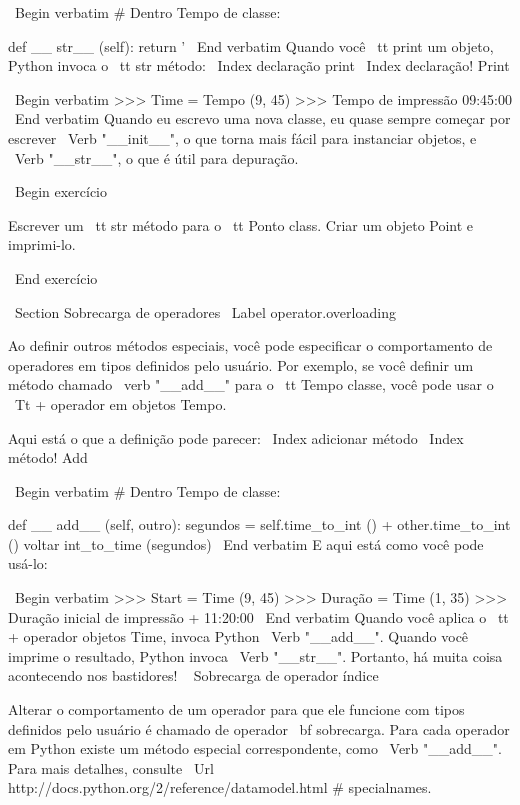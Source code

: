 \documentclass[10pt]{book}
\begin{document}
{{{{{{{{{{{{{{\ Begin {verbatim}
# Dentro Tempo de classe:

    def __ str__ (self):
        return '%
\ End {verbatim}
%
Quando você {\ tt print} um objeto, Python invoca o {\ tt str} método:
\ Index {declaração print}
\ Index {declaração! Print}

\ Begin {verbatim}
>>> Time = Tempo (9, 45)
>>> Tempo de impressão
09:45:00
\ End {verbatim}
%
Quando eu escrevo uma nova classe, eu quase sempre começar por escrever 
\ Verb "__init__", o que torna mais fácil para instanciar objetos, e 
\ Verb "__str__", o que é útil para depuração.


\ Begin {} exercício

Escrever um {\ tt str} método para o {\ tt Ponto} class. Criar
um objeto Point e imprimi-lo.

\ End {} exercício


\ Section {} Sobrecarga de operadores
\ Label {} operator.overloading

Ao definir outros métodos especiais, você pode especificar o comportamento
de operadores em tipos definidos pelo usuário. Por exemplo, se você definir
um método chamado \ verb "__add__" para o {\ tt Tempo} classe, você pode usar o
{\ Tt +} operador em objetos Tempo.

Aqui está o que a definição pode parecer:
\ Index {adicionar método}
\ Index {método! Add}

\ Begin {verbatim}
# Dentro Tempo de classe:

    def __ add__ (self, outro):
        segundos = self.time_to_int () + other.time_to_int ()
        voltar int_to_time (segundos)
\ End {verbatim}
%
E aqui está como você pode usá-lo:

\ Begin {verbatim}
>>> Start = Time (9, 45)
>>> Duração = Time (1, 35)
>>> Duração inicial de impressão +
11:20:00
\ End {verbatim}
%
Quando você aplica o {\ tt +} operador objetos Time, invoca Python
\ Verb "__add__". Quando você imprime o resultado, Python invoca
\ Verb "__str__". Portanto, há muita coisa acontecendo nos bastidores!
\ {} Sobrecarga de operador índice

Alterar o comportamento de um operador para que ele funcione com
tipos definidos pelo usuário é chamado de operador {\ bf sobrecarga}. Para cada
operador em Python existe um método especial correspondente, como 
\ Verb "__add__". Para mais detalhes, consulte
\ Url {http://docs.python.org/2/reference/datamodel.html # specialnames}.

}}}}}}}}}}}}}}
\end{document}
